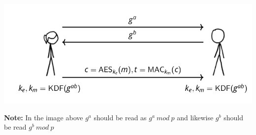 \documentclass[11pt]{article} %
\begin{document}
\begin{center}
	\includegraphics[scale=.7]{./tls2.png}
\end{center}

{\parindent0pt \textbf{Note:} In the image above $g^{a}$  should be read as 
$g^{a}\ mod\ p$ and likewise $g^{b}$ should be read $g^{b}\ mod\ p$}
\end{document}
